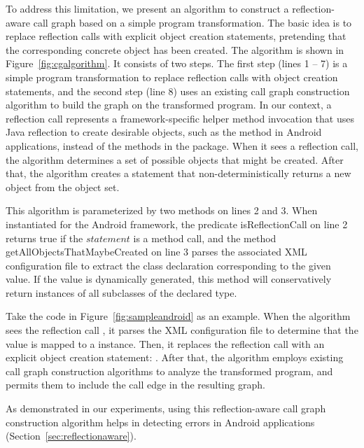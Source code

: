 To address this limitation, we present an algorithm to construct
a reflection-aware call graph based on a simple program transformation.
The basic idea is to replace reflection calls with explicit object
creation statements, pretending that the corresponding concrete object
has been created.  The algorithm is shown in Figure~\ref{fig:cgalgorithm}.
It consists of two steps. The first step (lines 1 -- 7) is a simple program
transformation to replace reflection calls with object creation statements, and
the second step (line 8) uses an existing call graph construction algorithm
to build the graph on the transformed program. In our context,
a reflection call represents a framework-specific helper method invocation
that uses Java reflection to create desirable objects, such as
the  method in Android applications, instead
of the methods in the  package.
When it sees a reflection call, the algorithm
determines a set of possible objects that might be created.
After that, the algorithm creates a statement that non-deterministically
returns a new object from the object set.

This algorithm is parameterized by two methods on
lines 2 and 3. When instantiated for the Android framework,
the predicate isReflectionCall on line 2 returns true
if the $statement$ is a  method call, and the method
getAllObjectsThatMaybeCreated on line 3 parses the associated XML configuration
file to extract the class declaration
 corresponding to the given  value. If the 
value is dynamically generated, this method will conservatively
return instances of all subclasses of the declared type.

Take the code in Figure~\ref{fig:sampleandroid} as an example.
When the algorithm sees the reflection call
, it
parses the XML configuration file to determine that the 
value is mapped to a  instance. Then, it
replaces the reflection call
with an explicit object creation statement: .
After that, the algorithm employs existing call graph construction
algorithms to analyze the transformed program, and permits them
to include the call edge  in the resulting graph.

As demonstrated in our experiments, using this reflection-aware call
graph construction algorithm helps in detecting errors
in Android applications (Section~\ref{sec:reflectionaware}).


